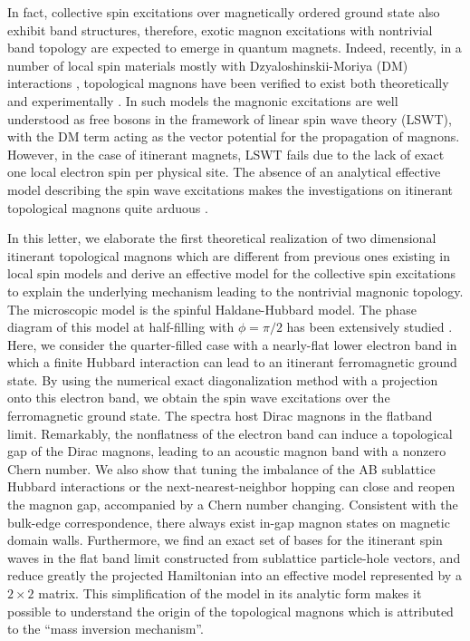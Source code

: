 \documentclass[amsmath,superscriptaddress,showpacs,aps,prl,twocolumn]{revtex4-1}
\begin{document}
\par In fact, collective spin excitations over magnetically ordered ground state also exhibit band structures, therefore, exotic magnon excitations with nontrivial band topology are expected to emerge in quantum magnets. Indeed, recently, in a number of local spin materials mostly with Dzyaloshinskii-Moriya (DM) interactions \cite{Dzyaloshinsky_JPCS1958,Moriya_PR1960}, topological magnons have been verified to exist both theoretically \cite{Zhang_PRB2013,Owerre_JPCM2016,Li_NC2016,Mook_PRL2016,Laurell_PRL2017} and experimentally \cite{Onose_S2010,Chisnell_PRL2015,Yao_NP2018,Bao_NC2018}. In such models the magnonic excitations are well understood as free bosons in the framework of linear spin wave theory (LSWT), with the DM term acting as the vector potential for the propagation of magnons. However, in the case of itinerant magnets, LSWT fails due to the lack of exact one local electron spin per physical site. The absence of an analytical effective model describing the spin wave excitations makes the investigations on itinerant topological magnons quite arduous \cite{Su_PRB2018}.

\par In this letter, we elaborate the first theoretical realization of two dimensional itinerant topological magnons which are different from previous ones existing in local spin models and derive an effective model for the collective spin excitations to explain the underlying mechanism leading to the nontrivial magnonic topology. The microscopic model is the spinful Haldane-Hubbard model. The phase diagram of this model at half-filling with $\phi=\pi/2$ has been extensively studied \cite{He_PRB2011a,Maciejko_PRB2013,Zheng_PRB2015,Hickey_PRL2016,Wu_PRB2016,Vanhala_PRL2016,Giuliani_PRB2016,Gu_NJP2019}. Here, we consider the quarter-filled case with a nearly-flat lower electron band in which a finite Hubbard interaction can lead to an itinerant ferromagnetic ground state. By using the numerical exact diagonalization method with a projection onto this electron band, we obtain the spin wave excitations over the ferromagnetic ground state. The spectra host Dirac magnons in the flatband limit. Remarkably, the nonflatness of the electron band can induce a topological gap of the Dirac magnons, leading to an acoustic magnon band with a nonzero Chern number. We also show that tuning the imbalance of the AB sublattice Hubbard interactions or the next-nearest-neighbor hopping can close and reopen the magnon gap, accompanied by a Chern number changing. Consistent with the bulk-edge correspondence, there always exist in-gap magnon states on magnetic domain walls.
Furthermore, we find an exact set of bases for the itinerant spin waves in the flat band limit constructed from sublattice particle-hole vectors, and reduce greatly the projected Hamiltonian into an effective model represented by a $2\times2$ matrix. This simplification of the model in its analytic form makes it possible to understand the origin of the topological magnons which is attributed to the ``mass inversion mechanism''.
\end{document}
